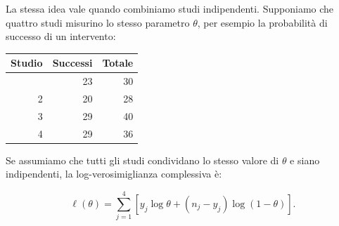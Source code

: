 \documentclass[
  italian,
  letterpaper,
  a4paper,
  11pt,
  open=any]{scrbook}
\newcounter{none} %
\theoremstyle{plain}
\theoremstyle{definition}
\theoremstyle{definition}
\theoremstyle{remark}
\begin{document}
La stessa idea vale quando combiniamo studi indipendenti. Supponiamo che
quattro studi misurino lo stesso parametro \(\theta\), per esempio la
probabilità di successo di un intervento:

{\def\LTcaptype{none} %
\begin{longtable}[]{@{}rrr@{}}
\toprule\noalign{}
Studio & Successi & Totale \\
\midrule\noalign{}
\endhead
\bottomrule\noalign{}
\endlastfoot
1 & 23 & 30 \\
2 & 20 & 28 \\
3 & 29 & 40 \\
4 & 29 & 36 \\
\end{longtable}
}

Se assumiamo che tutti gli studi condividano lo stesso valore di
\(\theta\) e siano indipendenti, la log-verosimiglianza complessiva è:

\[
\ell(\theta)
= \sum_{j=1}^{4}\left[y_j\log\theta + (n_j-y_j)\log(1-\theta)\right].
\]
\end{document}

